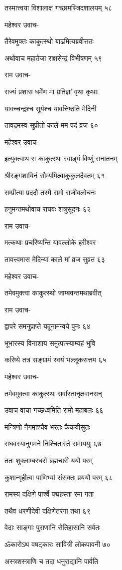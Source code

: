 तस्मात्त्वया विशालाक्ष गच्छामस्त्रिदशालयम् ५८

महेश्वर उवाच-

तैरेवमुक्तः काकुत्स्थो बाढमित्यब्रवीत्ततः

अथोवाच महातेजा राक्षसेन्द्रं विभीषणम् ५९

राम उवाच-

राज्यं प्रशास धर्मेण मा प्रतिज्ञां वृथा कृथाः

यावच्चन्द्रश्च सूर्यश्च यावत्तिष्ठति मेदिनी

तावद्रमस्व सुप्रीतो काले मम पदं व्रज ६०

महेश्वर उवाच-

इत्युक्त्वाथ स काकुत्स्थः स्वाड्गं विष्णुं सनातनम्

श्रीरङ्गशायिनं सौम्यमिक्ष्वाकुकुलदैवतम् ६१

सम्प्रीत्या प्रददौ तस्मै रामो राजीवलोचनः

हनुमन्तमथोवाच राघवः शत्रुसूदनः ६२

राम उवाच-

मत्कथाः प्रचरिष्यन्ति यावल्लोके हरीश्वर

तावत्त्वमास मेदिन्यां काले मां व्रज सुव्रत ६३

महेश्वर उवाच-

तमेवमुक्त्वा काकुत्स्थो जाम्बवन्तमथाब्रवीत्

राम उवाच-

द्वापरे समनुप्राप्ते यदूनामन्वये पुनः ६४

भूभारस्य विनाशाय समुत्पत्स्याम्यहं भुवि

करिष्ये तत्र सङ्ग्रामं स्वयं भल्लूकसत्तम ६५

महेश्वर उवाच-

तमेवमुक्त्वा काकुत्स्थः सर्वांस्तानृक्षवानरान्

उवाच वाचा गच्छध्वमिति रामो महाबलः ६६

मन्त्रिणो नैगमाश्चैव भरतः कैकयीसुतः

राघवस्यानुगमने निश्चितास्ते समाययुः ६७

ततः शुक्लाम्बरधरो ब्रह्मचारी ययौ परम्

कुशान्गृहीत्वा पाणिभ्यां संसक्तः प्रययौ परम् ६८

रामस्य दक्षिणे पार्श्वे पद्महस्ता रमा गता

तथैव धरणीदेवी दक्षिणेतरगा तथा ६९

वेदाः साङ्गाः पुराणानि सेतिहासानि सर्वतः

ॐकारोऽथ वषट्कारः सावित्री लोकपावनी ७०

अस्त्रशस्त्राणि च तदा धनुराद्यानि पार्वति

